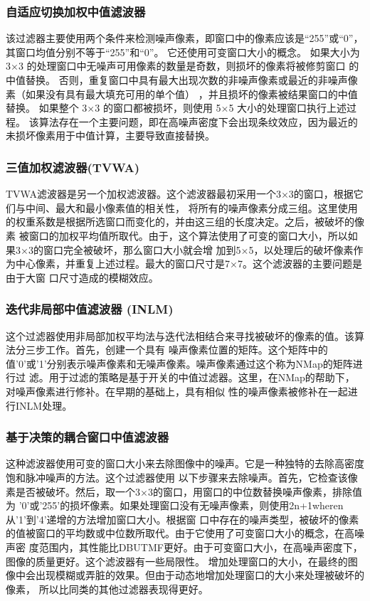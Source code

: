 \documentclass[12pt]{article} %
\begin{document}
\subsubsection{自适应切换加权中值滤波器}
该过滤器主要使用两个条件来检测噪声像素，即窗口中的像素应该是“255”或“0”，其窗口均值分别不等于“255”和“0”\cite{ref12}。
 它还使用可变窗口大小的概念。 如果大小为 3×3 的处理窗口中无噪声可用像素的数量是奇数，则损坏的像素将被修剪窗口
 的中值替换。 否则，重复窗口中具有最大出现次数的非噪声像素或最近的非噪声像素（如果没有具有最大填充可用的单个值）
 ，并且损坏的像素被结果窗口的中值替换。 如果整个 3×3 的窗口都被损坏，则使用 5×5 大小的处理窗口执行上述过程。 
 该算法存在一个主要问题，即在高噪声密度下会出现条纹效应，因为最近的未损坏像素用于中值计算，主要导致直接替换。

\subsubsection{三值加权滤波器(TVWA)}
 TVWA滤波器\cite{ref17}是另一个加权滤波器。这个滤波器最初采用一个3×3的窗口，根据它们与中间、最大和最小像素值的相关性，
 将所有的噪声像素分成三组。这里使用的权重系数是根据所选窗口而变化的，并由这三组的长度决定。之后，被破坏的像素
 被窗口的加权平均值所取代。由于，这个算法使用了可变的窗口大小，所以如果3×3的窗口完全被破坏，那么窗口大小就会增
 加到5×5，以处理后的破坏像素作为中心像素，并重复上述过程。最大的窗口尺寸是7×7。这个滤波器的主要问题是由于大窗
 口尺寸造成的模糊效应。

\subsubsection{迭代非局部中值滤波器 (INLM)}
 这个过滤器使用非局部加权平均法与迭代法相结合来寻找被破坏的像素的值\cite{ref30}。该算法分三步工作。首先，创建一个具有
 噪声像素位置的矩阵。这个矩阵中的值'0'或'1'分别表示噪声像素和无噪声像素。噪声像素通过这个称为NMap的矩阵进行过
 滤。用于过滤的策略是基于开关的中值过滤器。这里，在NMap的帮助下，对噪声像素进行修补。在早期的基础上，具有相似
 性的噪声像素被修补在一起进行INLM处理\cite{ref30}。

\subsubsection{基于决策的耦合窗口中值滤波器}
这种滤波器使用可变的窗口大小来去除图像中的噪声\cite{ref4}。它是一种独特的去除高密度饱和脉冲噪声的方法。这个过滤器使用
以下步骤来去除噪声。首先，它检查该像素是否被破坏。然后，取一个3×3的窗口，用窗口的中位数替换噪声像素，排除值为
'0'或'255'的损坏像素。如果处理窗口没有无噪声像素，则使用2n+1wheren从'1'到'4'递增的方法增加窗口大小。根据窗
口中存在的噪声类型，被破坏的像素的值被窗口的平均数或中位数所取代。由于它使用了可变窗口大小的概念，在高噪声密
度范围内，其性能比DBUTMF\cite{ref11}更好。由于可变窗口大小，在高噪声密度下，图像的质量更好。这个滤波器有一些局限性。
增加处理窗口的大小，在最终的图像中会出现模糊或弄脏的效果。但由于动态地增加处理窗口的大小来处理被破坏的像素，
所以比同类的其他过滤器表现得更好。
\end{document}
